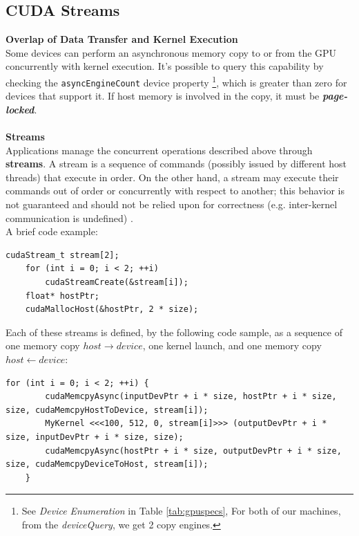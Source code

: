 	\subsection{CUDA Streams}
	\label{subs:streams} 
	\textbf{Overlap of Data Transfer and Kernel Execution}\\
	Some devices can perform an asynchronous memory copy to or from the GPU	concurrently with kernel execution. 
	It's possible to query this capability by checking the \texttt{asyncEngineCount} device property \footnote{ See \textit{Device Enumeration} in Table \ref{tab:gpuspecs}, For both of our machines, from the \textit{deviceQuery}, we get 2 copy engines.}, which is greater than zero for devices that support it. If host memory is involved in the copy, it must be
	\textit{\textbf{page-locked}}.\\\\
	\Large \textbf{Streams}\normalsize\\
	Applications manage the concurrent operations described above through \textbf{streams}. A stream is a sequence of commands (possibly issued by different host threads) that execute in order. On the other hand, a stream may execute their commands out of order or concurrently with respect to another; this behavior is not guaranteed and	should not be relied upon for correctness (e.g. inter-kernel communication is undefined) \cite{cudaguide}.\\
	A brief code example:
	\begin{lstlisting}[caption={CUDA Strams creation}]
	cudaStream_t stream[2];
	for (int i = 0; i < 2; ++i)
		cudaStreamCreate(&stream[i]);
	float* hostPtr;
	cudaMallocHost(&hostPtr, 2 * size);
	\end{lstlisting}	

	Each of these streams is defined, by the following code sample, as a sequence of one memory copy \(host \rightarrow device\), one kernel launch, and one memory copy \(host \leftarrow device\):
	\begin{lstlisting}[caption={CUDA Strams and Async example}]
	for (int i = 0; i < 2; ++i) {
		cudaMemcpyAsync(inputDevPtr + i * size, hostPtr + i * size, size, cudaMemcpyHostToDevice, stream[i]);
		MyKernel <<<100, 512, 0, stream[i]>>> (outputDevPtr + i * size, inputDevPtr + i * size, size);
		cudaMemcpyAsync(hostPtr + i * size, outputDevPtr + i * size, size, cudaMemcpyDeviceToHost, stream[i]);
	}
	\end{lstlisting}
	
